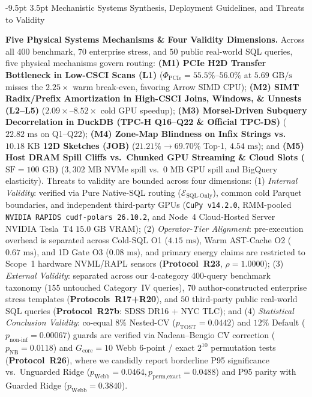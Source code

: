 \documentclass[10pt,a4paper]{article}
\makeatletter
\renewcommand\section{\@startsection{section}{1}{\z@}%
  {-9.5pt \@plus -2pt \@minus -1.5pt}%
  {3.5pt \@plus 1pt}%
  {\normalfont\large\bfseries}}
\makeatother
\begin{document}
\section{Mechanistic Systems Synthesis, Deployment Guidelines, and Threats to Validity}
\par\noindent\textbf{Five Physical Systems Mechanisms \& Four Validity Dimensions.} Across all $400$ benchmark, $70$ enterprise stress, and $50$ public real-world SQL queries, five physical mechanisms govern routing: \textbf{(M1) PCIe H2D Transfer Bottleneck in Low-CSCI Scans (L1)} ($\Phi_{\text{PCIe}}=55.5\%\text{--}56.0\%$ at $5.69\text{ GB/s}$ misses the $2.25\times$ warm break-even, favoring Arrow SIMD CPU); \textbf{(M2) SIMT Radix/Prefix Amortization in High-CSCI Joins, Windows, \& Unnests (L2--L5)} ($2.09\times\text{--}8.52\times$ cold GPU speedup); \textbf{(M3) Morsel-Driven Subquery Decorrelation in DuckDB (TPC-H Q16--Q22 \& Official TPC-DS)} ($22.82\text{ ms}$ on Q1--Q22); \textbf{(M4) Zone-Map Blindness on Infix Strings vs.\ $10.18\text{ KB}$ 12D Sketches (JOB)} ($21.21\%\rightarrow 69.70\%$ Top-1, $4.54\text{ ms}$); and \textbf{(M5) Host DRAM Spill Cliffs vs.\ Chunked GPU Streaming \& Cloud Slots ($\text{SF}=100\text{ GB}$)} ($3{,}302\text{ MB}$ NVMe spill vs.\ $0\text{ MB}$ GPU spill and BigQuery elasticity). Threats to validity are bounded across four dimensions: (1) \emph{Internal Validity}: verified via Pure Native-SQL routing ($\mathcal{E}_{\text{SQL-Only}}$), common cold Parquet boundaries, and independent third-party GPUs (\texttt{CuPy v14.2.0}, RMM-pooled \texttt{NVIDIA RAPIDS cudf-polars 26.10.2}, and Node~4 Cloud-Hosted Server NVIDIA Tesla~T4 $15.0\text{ GB}$ VRAM); (2) \emph{Operator-Tier Alignment}: pre-execution overhead is separated across Cold-SQL O1 ($4.15\text{ ms}$), Warm AST-Cache O2 ($0.67\text{ ms}$), and 1D Gate O3 ($0.08\text{ ms}$), and primary energy claims are restricted to Scope~1 hardware NVML/RAPL sensors (\textbf{Protocol~R23}, $\rho=1.0000$); (3) \emph{External Validity}: separated across our 4-category 400-query benchmark taxonomy ($155$ untouched Category~IV queries), $70$ author-constructed enterprise stress templates (\textbf{Protocols~R17+R20}), and $50$ third-party public real-world SQL queries (\textbf{Protocol~R27b}: SDSS DR16 + NYC TLC); and (4) \emph{Statistical Conclusion Validity}: co-equal $8\%$ Nested-CV ($p_{\text{TOST}}=0.0442$) and $12\%$ Default ($p_{\text{non-inf}}=0.00067$) guards are verified via Nadeau--Bengio CV correction ($p_{\text{NB}}=0.0118$) and $G_{\text{core}}=10$ Webb 6-point / exact $2^{10}$ permutation tests (\textbf{Protocol~R26}), where we candidly report borderline P95 significance vs.\ Unguarded Ridge ($p_{\text{Webb}}=0.0464, p_{\text{perm,exact}}=0.0488$) and P95 parity with Guarded Ridge ($p_{\text{Webb}}=0.3840$).
\end{document}
